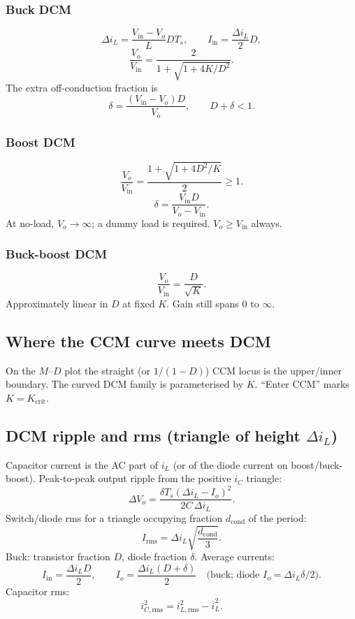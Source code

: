 \subsubsection{Buck DCM}
\[
\Delta i_L=\frac{V_{\mathrm{in}}-V_o}{L}D T_s,\qquad I_{\mathrm{in}}=\frac{\Delta i_L}{2}D,
\]
\[
\frac{V_o}{V_{\mathrm{in}}}=\frac{2}{1+\sqrt{1+4K/D^2}}.
\]
The extra off-conduction fraction is
\[
\delta=\frac{(V_{\mathrm{in}}-V_o)D}{V_o},\qquad D+\delta<1.
\]

\subsubsection{Boost DCM}
\[
\frac{V_o}{V_{\mathrm{in}}}=\frac{1+\sqrt{1+4D^2/K}}{2}\ge 1.
\]
\[
\delta=\frac{V_{\mathrm{in}} D}{V_o-V_{\mathrm{in}}}.
\]
At no-load, \(V_o\to\infty\); a dummy load is required. \(V_o\ge V_{\mathrm{in}}\) always.

\subsubsection{Buck-boost DCM}
\[
\frac{V_o}{V_{\mathrm{in}}}=\frac{D}{\sqrt{K}}.
\]
Approximately linear in \(D\) at fixed \(K\). Gain still spans \(0\) to \(\infty\).

\subsection{Where the CCM curve meets DCM}
On the \(M\)--\(D\) plot the straight (or \(1/(1-D)\)) CCM locus is the upper/inner boundary. The curved DCM family is parameterised by \(K\). ``Enter CCM'' marks \(K=K_{\mathrm{crit}}\).

\subsection{DCM ripple and rms (triangle of height \(\Delta i_L\))}
Capacitor current is the AC part of \(i_L\) (or of the diode current on boost/buck-boost). Peak-to-peak output ripple from the positive \(i_C\) triangle:
\[
\Delta V_o=\frac{\delta T_s(\Delta i_L-I_o)^2}{2C\,\Delta i_L}.
\]
Switch/diode rms for a triangle occupying fraction \(d_{\mathrm{cond}}\) of the period:
\[
I_{\mathrm{rms}}=\Delta i_L\sqrt{\frac{d_{\mathrm{cond}}}{3}}.
\]
Buck: transistor fraction \(D\), diode fraction \(\delta\). Average currents:
\[
I_{\mathrm{in}}=\frac{\Delta i_L D}{2},\qquad I_o=\frac{\Delta i_L(D+\delta)}{2}\quad\text{(buck; diode \(I_o=\Delta i_L\delta/2\))}.
\]
Capacitor rms:
\[
i_{C,\mathrm{rms}}^2=i_{L,\mathrm{rms}}^2-\overline{i}_L^2.
\]

